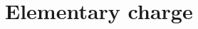 \hypertarget{group___elementary_charge}{}\section{Elementary charge}
\label{group___elementary_charge}

